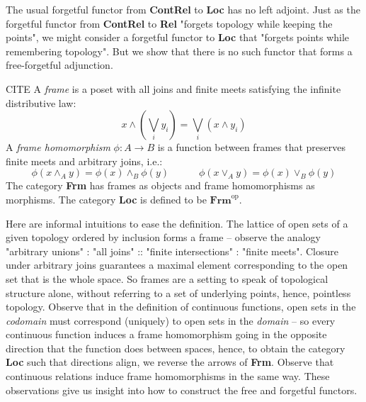 The usual forgetful functor from \textbf{ContRel} to \textbf{Loc} has no left adjoint. Just as the forgetful functor from \textbf{ContRel} to \textbf{Rel} "forgets topology while keeping the points", we might consider a forgetful functor to \textbf{Loc} that "forgets points while remembering topology". But we show that there is no such functor that forms a free-forgetful adjunction.

\begin{rem}\bR CITE \e
A \emph{frame} is a poset with all joins and finite meets satisfying the infinite distributive law:
\[x \wedge (\bigvee\limits_{i}y_i) = \bigvee\limits_{i}(x \wedge y_i)\]
A \emph{frame homomorphism} $\phi: A \rightarrow B$ is a function between frames that preserves finite meets and arbitrary joins, i.e.:
\[\phi(x \wedge_A y) = \phi(x) \wedge_B \phi(y) \quad \quad \quad \phi(x \vee_A y) = \phi(x) \vee_B \phi(y)\]
The category \textbf{Frm} has frames as objects and frame homomorphisms as morphisms. The category \textbf{Loc} is defined to be $\textbf{Frm}^\text{op}$.
\end{rem}

\begin{remark}
Here are informal intuitions to ease the definition. The lattice of open sets of a given topology ordered by inclusion forms a frame -- observe the analogy "arbitrary unions" : "all joins" :: "finite intersections" : "finite meets". Closure under arbitrary joins guarantees a maximal element corresponding to the open set that is the whole space. So frames are a setting to speak of topological structure alone, without referring to a set of underlying points, hence, pointless topology. Observe that in the definition of continuous functions, open sets in the \emph{codomain} must correspond (uniquely) to open sets in the \emph{domain} -- so every continuous function induces a frame homomorphism going in the opposite direction that the function does between spaces, hence, to obtain the category \textbf{Loc} such that directions align, we reverse the arrows of \textbf{Frm}. Observe that continuous relations induce frame homomorphisms in the same way. These observations give us insight into how to construct the free and forgetful functors.
\end{remark}

